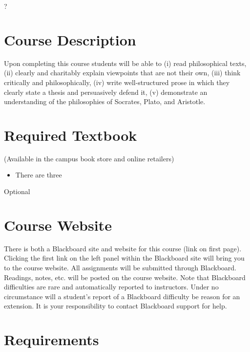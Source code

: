 \documentclass[article,oneside]{memoir}
\begin{document}
?

\section{Course Description}

Upon completing this course students will be able to (i) read
philosophical texts, (ii) clearly and charitably explain viewpoints that
are not their own, (iii) think critically and philosophically, (iv)
write well-structured prose in which they clearly state a thesis and
persuasively defend it, (v) demonstrate an understanding of the
philosophies of Socrates, Plato, and Aristotle.


\section{Required Textbook}
(Available in the campus book store and online retailers)
\begin{itemize}
\item There are three 
\end{itemize}
Optional

\section{Course Website}
There is both a Blackboard site and website for this course (link on first page). Clicking the first link on the left panel within the Blackboard site will bring you to the course website. All assignments will be submitted through Blackboard. Readings, notes, etc. will be posted on the course website. Note that Blackboard difficulties are rare and automatically reported to instructors. Under no circumstance will a student's report of a Blackboard difficulty be reason for an extension. It is your responsibility to contact Blackboard support for help.


\section{Requirements}
\end{document}

